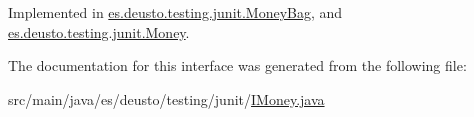 Implemented in \hyperlink{classes_1_1deusto_1_1testing_1_1junit_1_1_money_bag_a7f1803fe267edca895cdf752b5f46560}{es.\+deusto.\+testing.\+junit.\+Money\+Bag}, and \hyperlink{classes_1_1deusto_1_1testing_1_1junit_1_1_money_aada973cd1a31410ed2b7e5d2ae6bc2e9}{es.\+deusto.\+testing.\+junit.\+Money}.



The documentation for this interface was generated from the following file\+:\begin{DoxyCompactItemize}
\item 
src/main/java/es/deusto/testing/junit/\hyperlink{_i_money_8java}{I\+Money.\+java}\end{DoxyCompactItemize}
